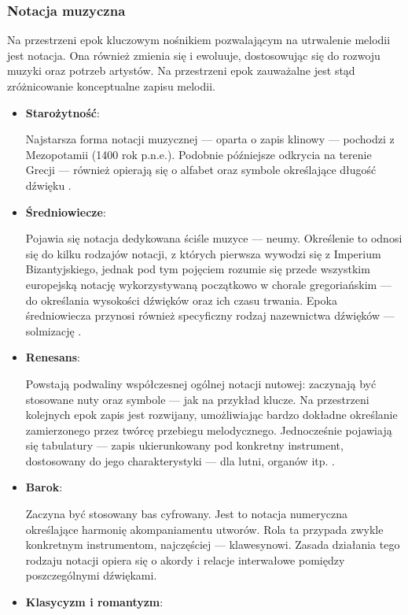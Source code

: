 \subsubsection{Notacja muzyczna}
Na przestrzeni epok kluczowym nośnikiem pozwalającym na utrwalenie melodii jest notacja.
Ona również zmienia się i ewoluuje, dostosowując się do rozwoju muzyki oraz potrzeb artystów.
Na przestrzeni epok zauważalne jest stąd zróżnicowanie konceptualne zapisu melodii.
\begin{itemize}
	\item \textbf{Starożytność}:

	      Najstarsza forma notacji muzycznej — oparta o zapis klinowy — pochodzi z Mezopotamii (1400 rok p.n.e.).
	      Podobnie późniejsze odkrycia na terenie Grecji — również opierają się o alfabet
	      oraz symbole określające długość dźwięku \cite{atlas1}.
	\item \textbf{Średniowiecze}:

	      Pojawia się notacja dedykowana ściśle muzyce — neumy. Określenie to odnosi się do kilku rodzajów notacji, z których pierwsza wywodzi
	      się z Imperium Bizantyjskiego, jednak pod tym pojęciem rozumie się przede wszystkim europejską notację wykorzystywaną początkowo w chorale
	      gregoriańskim — do określania wysokości dźwięków oraz ich czasu trwania.
	      Epoka średniowiecza przynosi również specyficzny rodzaj nazewnictwa dźwięków — solmizację \cite{abc}.
	\item \textbf{Renesans}:

	      Powstają podwaliny współczesnej ogólnej notacji nutowej: zaczynają być stosowane nuty oraz symbole
	      — jak na przykład klucze.
	      Na przestrzeni kolejnych epok zapis jest rozwijany, umożliwiając bardzo dokładne określanie zamierzonego przez twórcę przebiegu
	      melodycznego.
	      Jednocześnie pojawiają się tabulatury — zapis ukierunkowany pod konkretny instrument, dostosowany do jego charakterystyki —
	      dla lutni, organów itp. \cite{atlas1}.
	\item \textbf{Barok}:

	      Zaczyna być stosowany bas cyfrowany.
	      Jest to notacja numeryczna określające harmonię akompaniamentu utworów.
	      Rola ta przypada zwykle konkretnym instrumentom, najczęściej — klawesynowi.
	      Zasada działania tego rodzaju notacji opiera się o akordy i relacje interwałowe pomiędzy poszczególnymi dźwiękami.
	\item \textbf{Klasycyzm i romantyzm}:


\end{itemize}
